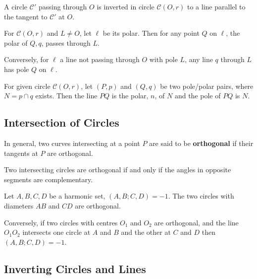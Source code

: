\begin{corollary}
    A circle \(\mathcal{C}'\) passing through \(O\) is inverted in circle \(\mathcal{C}(O, r)\) to a line parallel to the tangent to \(\mathcal{C}'\) at \(O\).
\end{corollary}

\begin{theorem}
    \setlength{\parindent}{1em}
    For \(\mathcal{C}(O, r)\) and \(L \neq O\), let \(\ell\) be its polar. Then for any point \(Q\) on \(\ell\), the polar of \(Q, q\), passes through \(L\).

    Conversely, for \(\ell\) a line not passing through \(O\) with pole \(L\), any line \(q\) through \(L\) has pole \(Q\) on \(\ell\).
\end{theorem}

\begin{corollary}
    For given circle \(\mathcal{C}(O, r)\), let \((P, p)\) and \((Q, q)\) be two pole/polar pairs, where \(N = p \cap q\) exists. Then the line \(PQ\) is the polar, \(n\), of \(N\) and the pole of \(PQ\) is \(N\).
\end{corollary}

\subsection{Intersection of Circles}

In general, two curves intersecting at a point \(P\) are said to be \textbf{orthogonal} if their tangents at \(P\) are orthogonal.

\begin{theorem}
    Two intersecting circles are orthogonal if and only if the angles in opposite segments are complementary.
\end{theorem}

\begin{theorem}
    \setlength{\parindent}{1em}
    Let \(A, B, C, D\) be a harmonic set, \((A, B; C, D) = -1\). The two circles with diameters \(AB\) and \(CD\) are orthogonal.

    Conversely, if two circles with centres \(O_1\) and \(O_2\) are orthogonal, and the line \(O_1O_2\) intersects one circle at \(A\) and \(B\) and the other at \(C\) and \(D\) then \((A, B; C, D) = -1\).
\end{theorem}

\subsection{Inverting Circles and Lines}

